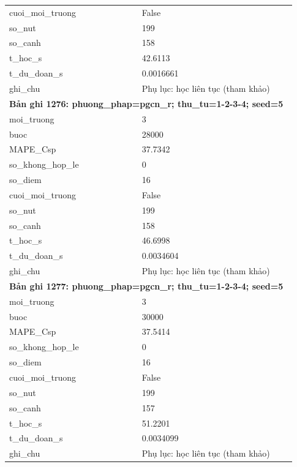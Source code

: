 \begin{longtable}{p{0.43\linewidth}p{0.50\linewidth}}
cuoi\_\allowbreak moi\_\allowbreak truong & False \\
so\_\allowbreak nut & 199 \\
so\_\allowbreak canh & 158 \\
t\_\allowbreak hoc\_\allowbreak s & 42.6113 \\
t\_\allowbreak du\_\allowbreak doan\_\allowbreak s & 0.0016661 \\
ghi\_\allowbreak chu & Phụ lục: học liên tục (tham khảo) \\
\midrule
\multicolumn{2}{p{0.95\linewidth}}{\textbf{Bản ghi 1276: phuong\_phap=pgcn\_r; thu\_tu=1-2-3-4; seed=5}} \\
moi\_\allowbreak truong & 3 \\
buoc & 28000 \\
MAPE\_\allowbreak Csp & 37.7342 \\
so\_\allowbreak khong\_\allowbreak hop\_\allowbreak le & 0 \\
so\_\allowbreak diem & 16 \\
cuoi\_\allowbreak moi\_\allowbreak truong & False \\
so\_\allowbreak nut & 199 \\
so\_\allowbreak canh & 158 \\
t\_\allowbreak hoc\_\allowbreak s & 46.6998 \\
t\_\allowbreak du\_\allowbreak doan\_\allowbreak s & 0.0034604 \\
ghi\_\allowbreak chu & Phụ lục: học liên tục (tham khảo) \\
\midrule
\multicolumn{2}{p{0.95\linewidth}}{\textbf{Bản ghi 1277: phuong\_phap=pgcn\_r; thu\_tu=1-2-3-4; seed=5}} \\
moi\_\allowbreak truong & 3 \\
buoc & 30000 \\
MAPE\_\allowbreak Csp & 37.5414 \\
so\_\allowbreak khong\_\allowbreak hop\_\allowbreak le & 0 \\
so\_\allowbreak diem & 16 \\
cuoi\_\allowbreak moi\_\allowbreak truong & False \\
so\_\allowbreak nut & 199 \\
so\_\allowbreak canh & 157 \\
t\_\allowbreak hoc\_\allowbreak s & 51.2201 \\
t\_\allowbreak du\_\allowbreak doan\_\allowbreak s & 0.0034099 \\
ghi\_\allowbreak chu & Phụ lục: học liên tục (tham khảo) \\

\end{longtable}
